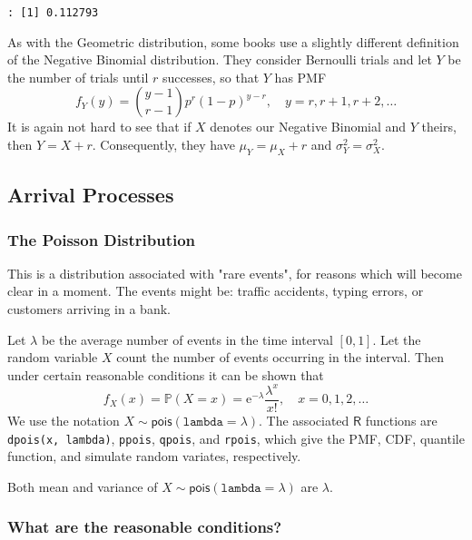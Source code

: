 \begin{verbatim}
: [1] 0.112793
\end{verbatim}

\begin{note}
As with the Geometric distribution, some books use a slightly
different definition of the Negative Binomial distribution. They
consider Bernoulli trials and let \(Y\) be the number of trials until
\(r\) successes, so that \(Y\) has PMF
\begin{equation}
f_{Y}(y)={y-1 \choose r-1}p^{r}(1-p)^{y-r},\quad y=r,r+1,r+2,\ldots
\end{equation}
It is again not hard to see that if \(X\) denotes our Negative
Binomial and \(Y\) theirs, then \(Y=X+r\). Consequently, they have
\(\mu_{Y}=\mu_{X}+r\) and \(\sigma_{Y}^{2}=\sigma_{X}^{2}\).
\end{note}

\subsection{Arrival Processes}
\label{sec-5-6-3}

\subsubsection{The Poisson Distribution}
\label{sec-5-6-3-1}

This is a distribution associated with "rare events", for reasons
which will become clear in a moment. The events might be:
traffic accidents,
typing errors, or
customers arriving in a bank.

Let \(\lambda\) be the average number of events in the time interval
\([0,1]\). Let the random variable \(X\) count the number of events
occurring in the interval. Then under certain reasonable conditions it
can be shown that
\begin{equation}
f_{X}(x)=\mathbb{P}(X=x)=\mathrm{e}^{-\lambda}\frac{\lambda^{x}}{x!},\quad x=0,1,2,\ldots
\end{equation}
We use the notation
\(X\sim\mathsf{pois}(\mathtt{lambda}=\lambda)\). The associated
\(\mathsf{R}\) functions are \texttt{dpois(x, lambda)}, \texttt{ppois}, \texttt{qpois}, and
\texttt{rpois}, which give the PMF, CDF, quantile function, and simulate
random variates, respectively.

Both mean and variance of \(X\sim\mathsf{pois}(\mathtt{lambda}=\lambda)\) are $\lambda$.

\subsubsection{What are the reasonable conditions?}
\label{sec-5-6-3-2}

